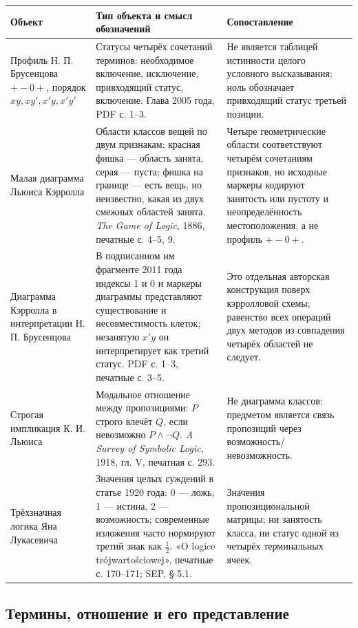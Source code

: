 \documentclass[12pt,a4paper]{article}
\begin{document}
\begin{center}
{\small
\setlength{\tabcolsep}{2.5pt}
\begin{tabular}{P{0.22\textwidth}P{0.38\textwidth}P{0.32\textwidth}}
\toprule
\textbf{Объект} & \textbf{Тип объекта и смысл обозначений} & \textbf{Сопоставление} \\
\midrule
Профиль Н. П. Брусенцова \(+-0+\), порядок \(xy,xy',x'y,x'y'\) & Статусы четырёх сочетаний терминов: необходимое включение, исключение, привходящий статус, включение. Глава 2005 года, PDF с. 1–3. & Не является таблицей истинности целого условного высказывания; ноль обозначает привходящий статус третьей позиции. \\
Малая диаграмма Льюиса Кэрролла & Области классов вещей по двум признакам; красная фишка — область занята, серая — пуста; фишка на границе — есть вещь, но неизвестно, какая из двух смежных областей занята. \emph{The Game of Logic}, 1886, печатные с. 4–5, 9. & Четыре геометрические области соответствуют четырём сочетаниям признаков, но исходные маркеры кодируют занятость или пустоту и неопределённость местоположения, а не профиль \(+-0+\). \\
Диаграмма Кэрролла в интерпретации Н. П. Брусенцова & В подписанном им фрагменте 2011 года индексы 1 и 0 и маркеры диаграммы представляют существование и несовместимость клеток; незанятую \(x'y\) он интерпретирует как третий статус. PDF с. 1–3, печатные с. 3–5. & Это отдельная авторская конструкция поверх кэрролловой схемы; равенство всех операций двух методов из совпадения четырёх областей не следует. \\
Строгая импликация К. И. Льюиса & Модальное отношение между пропозициями: \(P\) строго влечёт \(Q\), если невозможно \(P\land\neg Q\). \emph{A Survey of Symbolic Logic}, 1918, гл. V, печатная с. 293. & Не диаграмма классов: предметом является связь пропозиций через возможность/невозможность. \\
Трёхзначная логика Яна Лукасевича & Значения целых суждений в статье 1920 года: 0 — ложь, 1 — истина, 2 — возможность; современные изложения часто нормируют третий знак как \(\tfrac12\). «O logice trójwartościowej», печатные с. 170–171; SEP, § 5.1. & Значения пропозициональной матрицы; ни занятость класса, ни статус одной из четырёх терминальных ячеек. \\
\bottomrule
\end{tabular}
}
\end{center}

\newpage
\subsection{Термины, отношение и его представление}
\end{document}
